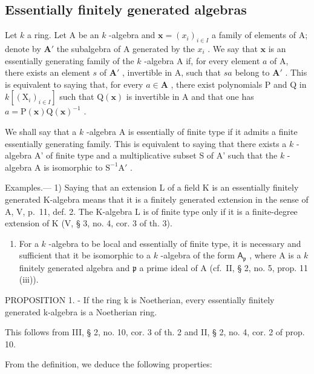 \subsection{Essentially finitely generated algebras}

Let \(k\) a ring. Let A be an \(k\) -algebra and \(\mathbf{x} = (x_i)_{i \in I}\) a family of elements of A; denote by \(\mathbf{A}'\) the subalgebra of A generated by the \(x_i\) . We say that \(\mathbf{x}\) is an essentially generating family of the \(k\) -algebra A if, for every element \(a\) of A, there exists an element \(s\) of \(\mathbf{A}'\) , invertible in A, such that \(sa\) belong to \(\mathbf{A}'\) . This is equivalent to saying that, for every \(a \in \mathbf{A}\) , there exist polynomials P and Q in \(k[(\mathrm{X}_i)_{i \in I}]\) such that \(\mathrm{Q}(\mathbf{x})\) is invertible in A and that one has \(a = \mathrm{P}(\mathbf{x})\mathrm{Q}(\mathbf{x})^{-1}\) .

We shall say that a \(k\) -algebra A is essentially of finite type if it admits a finite essentially generating family. This is equivalent to saying that there exists a \(k\) -algebra A' of finite type and a multiplicative subset S of A' such that the \(k\) -algebra A is isomorphic to \(\mathrm{S}^{-1}\mathrm{A}'\) .

Examples.--- 1) Saying that an extension L of a field K is an essentially finitely generated K-algebra means that it is a finitely generated extension in the sense of A, V, p.~11, def. 2. The K-algebra L is of finite type only if it is a finite-degree extension of K (V, § 3, no. 4, cor. 3 of th. 3).

\begin{enumerate}
\def\labelenumi{\arabic{enumi})}
\setcounter{enumi}{1}
\tightlist
\item
  For a \(k\) -algebra to be local and essentially of finite type, it is necessary and sufficient that it be isomorphic to a \(k\) -algebra of the form \(\mathsf{A}_{\mathfrak{p}}\) , where A is a \(k\) finitely generated algebra and \(\mathfrak{p}\) a prime ideal of A (cf.~II, § 2, no. 5, prop. 11 (iii)).
\end{enumerate}

PROPOSITION 1. - If the ring k is Noetherian, every essentially finitely generated k-algebra is a Noetherian ring.

This follows from III, § 2, no. 10, cor. 3 of th. 2 and II, § 2, no. 4, cor. 2 of prop. 10.

From the definition, we deduce the following properties:

